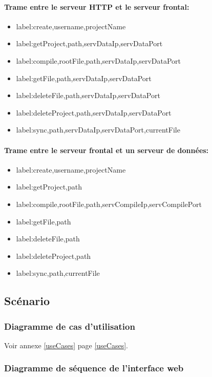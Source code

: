 \documentclass[a4paper,12pt]{article}
\begin{document}
\paragraph{Trame entre le serveur HTTP et le serveur frontal:}
\begin{itemize}
 \item label:create,username,projectName
 \item label:getProject,path,servDataIp,servDataPort
 \item label:compile,rootFile,path,servDataIp,servDataPort
 \item label:getFile,path,servDataIp,servDataPort
 \item label:deleteFile,path,servDataIp,servDataPort
 \item label:deleteProject,path,servDataIp,servDataPort
 \item label:sync,path,servDataIp,servDataPort,currentFile
\end{itemize}

\paragraph{Trame entre le serveur frontal et un serveur de données:}
\begin{itemize}
 \item label:create,username,projectName
 \item label:getProject,path
 \item label:compile,rootFile,path,servCompileIp,servCompilePort
 \item label:getFile,path
 \item label:deleteFile,path
 \item label:deleteProject,path
 \item label:sync,path,currentFile
\end{itemize}


\subsection{Scénario}
\subsubsection{Diagramme de cas d'utilisation}
Voir annexe \ref{useCases} page \ref{useCases}.

\subsubsection{Diagramme de séquence de l'interface web}
\end{document}
